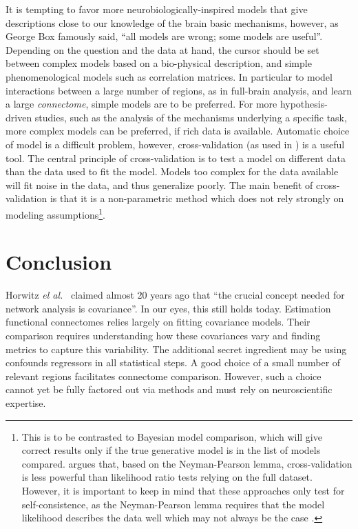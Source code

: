 \documentclass[5p]{elsarticle}
\begin{document}
It is tempting to favor more neurobiologically-inspired models that give
descriptions close to our knowledge of the brain basic mechanisms,
however, as George Box famously said, ``all models are wrong; some models
are useful''. Depending on the question and the data at hand, the cursor
should be set between complex models based on a bio-physical description,
and simple phenomenological models such as correlation matrices. In
particular to model interactions between a large number of regions, as in
full-brain analysis, and learn a large \emph{connectome}, simple models
are to be preferred. For more hypothesis-driven studies, such as the
analysis of the mechanisms underlying a specific task, more complex models
can be preferred, if rich data is available. Automatic choice of model is
a difficult problem, however, cross-validation (as used in
\cite{varoquaux2010c,craddock2011,strother2006}) is a useful tool. The
central principle of cross-validation is to test a model on different
data than the data used to fit the model. Models too complex
for the data available will fit noise in the data, and thus generalize
poorly. The main benefit of cross-validation is that it is a
non-parametric method which does not rely strongly on modeling
assumptions\footnote{This is to be contrasted to Bayesian model
comparison, which will give correct results only if the true generative
model is in the list of models compared. \cite{friston2012} argues that,
based on the Neyman-Pearson lemma, cross-validation is less powerful than
likelihood ratio tests relying on the full dataset. However, it is
important to keep in mind that these approaches only test for
self-consistence, as the Neyman-Pearson lemma requires that 
the model likelihood describes the data well which may not always be the
case \cite{lohmann2012}.}.



\section{Conclusion}

Horwitz \emph{el al.}\ \cite{horwitz1995} claimed almost 20 years ago
that ``the crucial concept needed for network analysis is covariance''.
In our eyes, this still holds today. Estimation functional connectomes
relies largely on fitting covariance models. Their comparison requires
understanding how these covariances vary and finding metrics to capture
this variability. The additional secret ingredient may be using  
confounds regressors in all statistical steps. A good choice of a small number of
relevant regions facilitates connectome comparison. However, such a
choice cannot yet be fully factored out via methods and must rely on
neuroscientific expertise.
\end{document}
